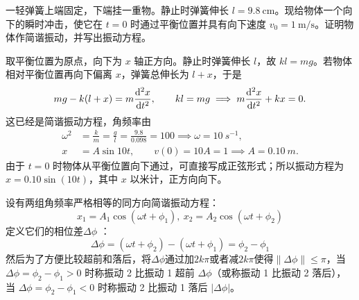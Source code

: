 \documentclass[lang=cn,11pt]{elegantbook}
\begin{document}
\begin{exercise}[用平衡位置证明竖直弹簧振子作简谐振动]
一轻弹簧上端固定，下端挂一重物。静止时弹簧伸长 \(l=9.8\ \text{cm}\)。现给物体一个向下的瞬时冲击，使它在 \(t=0\) 时通过平衡位置并具有向下速度 \(v_0=1\ \text{m/s}\)。证明物体作简谐振动，并写出振动方程。
\end{exercise}

\begin{solution}
取平衡位置为原点，向下为 \(x\) 轴正方向。静止时弹簧伸长 \(l\)，故 \(kl=mg\)。若物体相对平衡位置再向下偏离 \(x\)，弹簧总伸长为 \(l+x\)，于是
\[
mg-k(l+x)=m\dv[2]{x}{t},\qquad kl=mg
\implies m\dv[2]{x}{t}+kx=0.
\]
这已经是简谐振动方程，角频率由
\[
\begin{aligned}
\omega^2&=\frac{k}{m}=\frac{g}{l}
=\frac{9.8}{0.098}=100
\implies \omega=10\ \si{s^{-1}},\\
x&=A\sin 10t,\qquad v(0)=10A=1
\implies A=0.10\ \si{m}.
\end{aligned}
\]由于 \(t=0\) 时物体从平衡位置向下通过，可直接写成正弦形式；所以振动方程为 \(x=0.10\sin(10t)\)，其中 \(x\) 以米计，正方向向下。
\end{solution}

\begin{theorem}[简谐振动的相位关系]
设有两组角频率严格相等的同方向简谐振动方程：$$x_1 = A_1 \cos(\omega t + \phi_1),~x_2 = A_2 \cos(\omega t + \phi_2)$$
定义它们的相位差$\Delta \phi$ ：$$\Delta \phi = (\omega t + \phi_2) - (\omega t + \phi_1) = \phi_2 - \phi_1$$然后为了方便比较超前和落后，将$\Delta \phi$通过加$2k\pi$或者减$2k\pi$使得$\| \Delta \phi \| \le \pi$，当 $\Delta \phi = \phi_2 - \phi_1 > 0$ 时称振动 2 比振动 1 超前 $\Delta \phi$（或称振动 1 比振动 2 落后），当 $\Delta \phi = \phi_2 - \phi_1 < 0$ 时称振动 2 比振动 1 落后 $|\Delta \phi|$。
\end{theorem}
\end{document}
